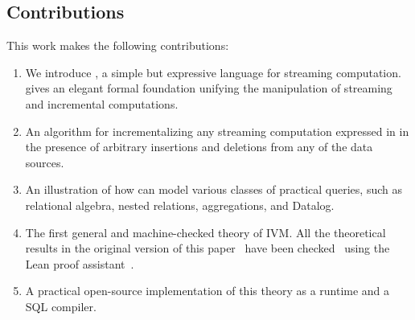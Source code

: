 \subsection{Contributions}

This work makes the following contributions:
\begin{enumerate}[nosep, leftmargin=0pt, itemindent=0.5cm, label=\textbf{(\arabic{*})}]
  \item We introduce \dbsp, a simple but expressive language for
    streaming computation. \dbsp gives an elegant formal foundation
    unifying the manipulation of streaming and incremental
    computations.
  \item An algorithm for incrementalizing any streaming
    computation expressed in \dbsp in the presence of arbitrary
    insertions and deletions from any of the data sources.
  \item An illustration of how \dbsp can model various classes of
    practical queries, such as relational algebra, nested relations,
    aggregations, and Datalog.
  \item The first general and machine-checked theory of IVM.  All the
    theoretical results in the original version of this
    paper~\cite{budiu-vldb23} have been checked~\cite{dbsp-theory}
    using the Lean proof assistant~\cite{moura-cade15}.
  \item A practical open-source implementation of this theory as a
    runtime and a SQL compiler.
\end{enumerate}

